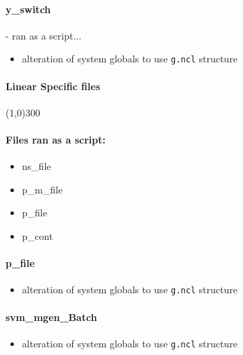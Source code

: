 \documentclass[12pt]{article}
\begin{document}
\paragraph{y\_switch} - ran as a script...
	\begin{itemize}
		\item alteration of system globals to use \verb|g.ncl| structure
	\end{itemize}

\paragraph{Linear Specific files}\line(1,0){300}

\paragraph{Files ran as a script:}
	\begin{itemize}
		\item ns\_file
		\item p\_m\_file
		\item p\_file
		\item p\_cont
	\end{itemize}
	
\paragraph{p\_file}
	\begin{itemize}
		\item alteration of system globals to use \verb|g.ncl| structure
	\end{itemize}

\paragraph{svm\_mgen\_Batch}
	\begin{itemize}
		\item alteration of system globals to use \verb|g.ncl| structure
	\end{itemize}
\end{document}
